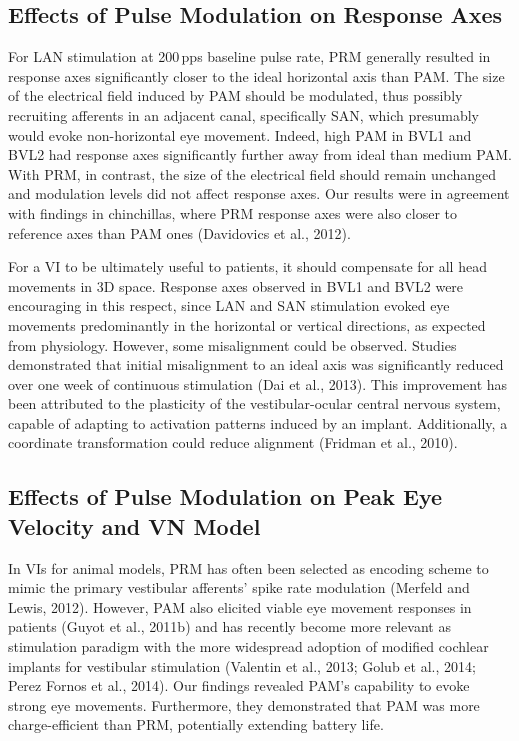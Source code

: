 \subsection{Effects of Pulse Modulation on Response Axes}
For LAN stimulation at 200\,pps baseline pulse rate, PRM generally resulted in response axes significantly closer to the ideal horizontal axis than PAM. The size of the electrical field induced by PAM should be modulated, thus possibly recruiting afferents in an adjacent canal, specifically SAN, which presumably would evoke non-horizontal eye movement. Indeed, high PAM in BVL1 and BVL2 had response axes significantly further away from ideal than medium PAM. With PRM, in contrast, the size of the electrical field should remain unchanged and modulation levels did not affect response axes. Our results were in agreement with findings in chinchillas, where PRM response axes were also closer to reference axes than PAM ones (Davidovics et al., 2012).

For a VI to be ultimately useful to patients, it should compensate for all head movements in 3D space. Response axes observed in BVL1 and BVL2 were encouraging in this respect, since LAN and SAN stimulation evoked eye movements predominantly in the horizontal or vertical directions, as expected from physiology. However, some misalignment could be observed. Studies demonstrated that initial misalignment to an ideal axis was significantly reduced over one week of continuous stimulation (Dai et al., 2013). This improvement has been attributed to the plasticity of the vestibular-ocular central nervous system, capable of adapting to activation patterns induced by an implant. Additionally, a coordinate transformation could reduce alignment (Fridman et al., 2010).

\subsection{Effects of Pulse Modulation on Peak Eye Velocity and VN Model}
In VIs for animal models, PRM has often been selected as encoding scheme to mimic the primary vestibular afferents’ spike rate modulation (Merfeld and Lewis, 2012). However, PAM also elicited viable eye movement responses in patients (Guyot et al., 2011b) and has recently become more relevant as stimulation paradigm with the more widespread adoption of modified cochlear implants for vestibular stimulation (Valentin et al., 2013; Golub et al., 2014; Perez Fornos et al., 2014). Our findings revealed PAM’s capability to evoke strong eye movements. Furthermore, they demonstrated that PAM was more charge-efficient than PRM, potentially extending battery life. 

